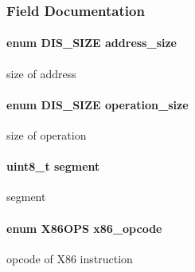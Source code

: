 \subsubsection{Field Documentation}
\hypertarget{struct_d_i_s__fixed_a772bedb1977f1ae07b9f55991f318bd8}{
\paragraph[{address\_\-size}]{\setlength{\rightskip}{0pt plus 5cm}enum {\bf DIS\_\-SIZE} {\bf address\_\-size}}}
\label{struct_d_i_s__fixed_a772bedb1977f1ae07b9f55991f318bd8}
size of address \hypertarget{struct_d_i_s__fixed_a1a17e54c88513da8e5b1175a785c51ae}{
\paragraph[{operation\_\-size}]{\setlength{\rightskip}{0pt plus 5cm}enum {\bf DIS\_\-SIZE} {\bf operation\_\-size}}}
\label{struct_d_i_s__fixed_a1a17e54c88513da8e5b1175a785c51ae}
size of operation \hypertarget{struct_d_i_s__fixed_afbf231e07d12db4d0ebf0bc223679ae5}{
\paragraph[{segment}]{\setlength{\rightskip}{0pt plus 5cm}uint8\_\-t {\bf segment}}}
\label{struct_d_i_s__fixed_afbf231e07d12db4d0ebf0bc223679ae5}
segment \hypertarget{struct_d_i_s__fixed_a372354efff5b025dc9324a03625338a2}{
\paragraph[{x86\_\-opcode}]{\setlength{\rightskip}{0pt plus 5cm}enum {\bf X86OPS} {\bf x86\_\-opcode}}}
\label{struct_d_i_s__fixed_a372354efff5b025dc9324a03625338a2}
opcode of X86 instruction 